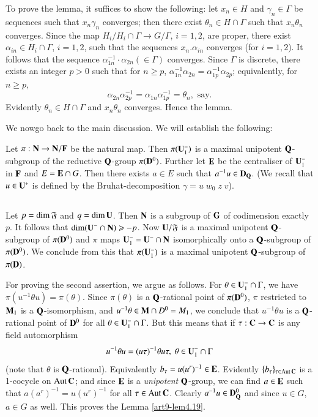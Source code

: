 To prove the lemma, it suffices to show the following: let $x_n \in H$ and $\gamma_n \in \Gamma$ be sequences such that $x_n \gamma_n$ converges; then there exist $\theta_n \in H \cap \Gamma$ such that $x_n \theta_n$ converges. Since the map $H_i/ H_i \cap \Gamma \to G/ \Gamma$, $i = 1, 2$, are proper, there exist $\alpha_{in} \in H_i \cap \Gamma$, $i = 1,2$, such that the sequences $x_n. \alpha_{in}$ converges (for $i = 1, 2$). It follows that the sequence $\alpha^{-1}_{1n} \cdot\alpha_{2n} (\in \Gamma)$ converges. Since $\Gamma$ is discrete, there exists an integer $p>0$ such that for $n \geqslant p$, $\alpha^{-1}_{1n} \alpha_{2n} = \alpha^{-1}_{1p} \alpha_{2p}$; equivalently, for $n \geqslant p$,
$$
\alpha_{2n} \alpha^{-1}_{2p} = \alpha_{1n} \alpha^{-1}_{1p} = \theta_n ,\text{ say}.
$$
Evidently $\theta_n \in H \cap \Gamma $ and $x_n \theta_n$ converges. Hence the lemma.

We now\pageoriginale go back to the main discussion. We will establish the following:

\begin{lemma}\label{art9-lem4.19}
Let $\pi : \mathbf{N} \to \mathbf{N} / \mathbf{F}$ be the natural map. Then $\pi(\mathbf{U}^-_1)$ is a maximal unipotent $\mathbf{Q}$-subgroup of the reductive $\mathbf{Q}$-group $\pi (\mathbf{D}^0)$. Further let $\mathbf{E}$ be the centraliser of $\mathbf{U}^-_1$ in $\mathbf{F}$ and $E = \mathbf{E} \cap G$. Then there exists $a \in E$ such that $a^{-1} u \in \mathbf{D}_{\mathbf{Q}}$. (We recall that $u \in \mathbf{U}^\ast$ is defined by the Bruhat-decomposition $\gamma = u \;w_0\; z \;v$).
\end{lemma}

\setcounter{subsection}{19}
\subsection{}\label{art9-subsec4.20}
Let $p = \dim \mathfrak{F}$ and $q = \dim \mathbf{U}$. Then $\mathbf{N}$ is a subgroup of $\mathbf{G}$ of codimension exactly $p$. It follows that $\dim (\mathbf{U}^- \cap \mathbf{N}) \geqslant - p$. Now $\mathbf{U}/\mathfrak{F}$ is a maximal unipotent $\mathbf{Q}$-subgroup of $\pi (\mathbf{D}^0)$ and $\pi$ maps $\mathbf{U}^-_1 = \mathbf{U}^- \cap \mathbf{N}$ isomorphically  onto a $\mathbf{Q}$-subgroup of $\pi (\mathbf{D}^0)$. We conclude from this that $\pi (\mathbf{U}^-_1)$ is a maximal unipotent $\mathbf{Q}$-subgroup of $\pi(\mathbf{D})$.

For proving the second assertion, we argue as follows. For $\theta \in \mathbf{U}^-_1 \cap \Gamma$, we have $\pi (u^{-1} \theta u) = \pi (\theta)$. Since $\pi (\theta)$ is a $\mathbf{Q}$-rational point of $\pi (\mathbf{D}^0)$, $\pi$ restricted to $\mathbf{M}_1$ is a $\mathbf{Q}$-isomorphism, and $u^{-1} \theta \in \mathbf{M} \cap D^0 = M_1$, we conclude that $u^{-1} \theta u$ is a $\mathbf{Q}$-rational point of $\mathbf{D}^0$ for all $\theta \in \mathbf{U}^-_1 \cap \Gamma$. But this means that if $\tau : \mathbf{C} \to \mathbf{C}$ is any field automorphism
$$
u^{-1} \theta u = (u \tau)^{-1} \theta u \tau, \; \theta \in \mathbf{U}^{-}_1 \cap \Gamma
$$
(note that $\theta$ is $\mathbf{Q}$-rational). Equivalently $b_\tau = u (u^r)^{-1} \in \mathbf{E}$. Evidently $\{b_\tau\}_{\tau \in \operatorname{Aut} \mathbf{C}}$ is a 1-cocycle on $\operatorname{Aut} \mathbf{C}$; and since $\mathbf{E}$ is a \textit{unipotent} $\mathbf{Q}$-group, we can find $a\in \mathbf{E}$ such that $a (a^r)^{-1} = u (u^r)^{-1}$ for all $\tau \in \operatorname{Aut} \mathbf{C}$. Clearly $a^{-1} u \in \mathbf{D}^0_{\mathbf{Q}}$ and since $u \in G$, $a \in G$ as well. This proves the Lemma \ref{art9-lem4.19}.

